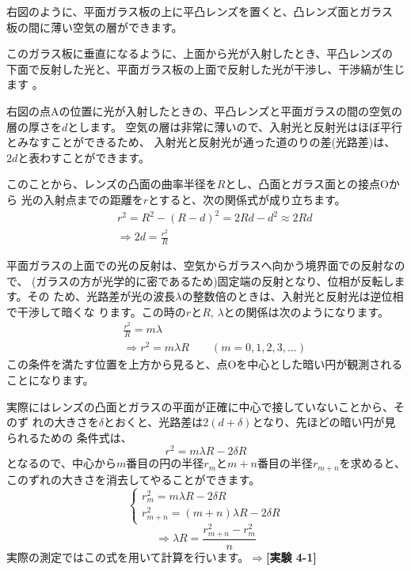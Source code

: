 右図のように、平面ガラス板の上に平凸レンズを置くと、凸レンズ面とガラス
板の間に薄い空気の層ができます。

このガラス板に垂直になるように、上面から光が入射したとき、平凸レンズの
下面で反射した光と、平面ガラス板の上面で反射した光が干渉し、干渉縞が生じ
ます 。

右図の点Aの位置に光が入射したときの、平凸レンズと平面ガラスの間の空気の層の厚さを$d$とします。
空気の層は非常に薄いので、入射光と反射光はほぼ平行とみなすことができるため、
入射光と反射光が通った道のりの差(光路差)は、$2d$と表わすことができます。

このことから、レンズの凸面の曲率半径を$R$とし、凸面とガラス面との接点Oから 
光の入射点までの距離を$r$とすると、次の関係式が成り立ちます。
\begin{eqnarray}
&&r^2 = R^2-(R-d)^2 = 2Rd-d^2\approx 2Rd\nonumber\\
&&\Rightarrow 2d=\frac{r^2}{R}\nonumber
\end{eqnarray}


平面ガラスの上面での光の反射は、空気からガラスへ向かう境界面での反射なので、
(ガラスの方が光学的に密であるため)固定端の反射となり、位相が反転します。その
ため、光路差が光の波長$\lambda$の整数倍のときは、入射光と反射光は逆位相で干渉して暗くな
ります。この時の$r$と$R$, $\lambda$との関係は次のようになります。
\begin{eqnarray}
&&\frac{r^2}{R}=m\lambda\nonumber\\
&&\Rightarrow r^2=m\lambda R
\qquad (m=0,1,2,3,\ldots)\nonumber
\end{eqnarray}
この条件を満たす位置を上方から見ると、点Oを中心とした暗い円が観測されることになります。

実際にはレンズの凸面とガラスの平面が正確に中心で接していないことから、そのず
れの大きさを$\delta$とおくと、光路差は$2(d+\delta)$となり、先ほどの暗い円が見られるための
条件式は、
\[
r^2 = m\lambda R-2\delta R
\]
となるので、中心から$m$番目の円の半径$r_m$と$m+n$番目の半径$r_{m+n}$を求めると、
このずれの大きさを消去してやることができます。
\[
\left\{
\begin{array}{l}
r_m^2=m\lambda R-2\delta R\\
r_{m+n}^2=(m+n)\lambda R-2\delta R
\end{array}
\right.
\] 
\begin{equation}
\Rightarrow
\boxed{
\lambda R =\frac{r_{m+n}^2 - r_m^2}{n}
}
\label{Newton}
\end{equation}
実際の測定ではこの式を用いて計算を行います。$\Rightarrow${\bf [実験 4-1]}


